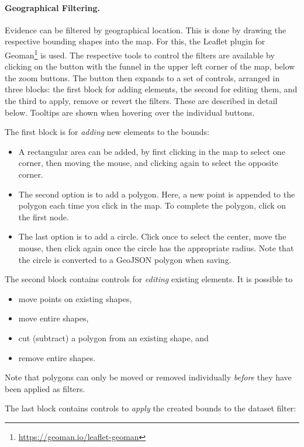 \paragraph{Geographical Filtering.}
Evidence can be filtered by geographical location.
This is done by drawing the respective bounding shapes into the map.
For this, the Leaflet plugin for Geoman\footnote{\url{https://geoman.io/leaflet-geoman}} is used.
The respective tools to control the filters are available by clicking on the button with the funnel in the upper left corner of the map, below the zoom buttons.
The button then expands to a set of controls, arranged in three blocks:
the first block for adding elements, the second for editing them, and the third to apply, remove or revert the filters.
These are described in detail below.
Tooltips are shown when hovering over the individual buttons.

The first block is for \emph{adding} new elements to the bounds:
\begin{itemize}
  \item A rectangular area can be added, by first clicking in the map to select one corner, then moving the mouse, and clicking again to select the opposite corner.
  \item
    The second option is to add a polygon.
    Here, a new point is appended to the polygon each time you click in the map.
    To complete the polygon, click on the first node.
  \item
    The last option is to add a circle.
    Click once to select the center, move the mouse, then click again once the circle has the appropriate radius.
    Note that the circle is converted to a GeoJSON polygon when saving.
\end{itemize}

The second block contains controls for \emph{editing} existing elements.
It is possible to
\begin{itemize}
  \item move points on existing shapes,
  \item move entire shapes,
  \item cut (subtract) a polygon from an existing shape, and
  \item remove entire shapes.
\end{itemize}
Note that polygons can only be moved or removed individually \emph{before} they have been applied as filters.

The last block contains controls to \emph{apply} the created bounds to the dataset filter:

